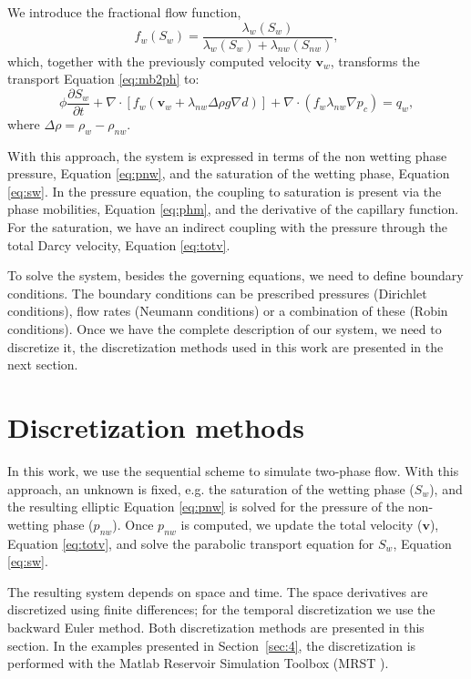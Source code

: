 \documentclass[times,final]{elsarticle}
\begin{document}
We introduce the fractional flow function, 
\begin{equation}\label{eq:fff}
f_{w}(S_w)=\frac{\lambda_{w}(S_w)}{\lambda_{w}(S_w)+\lambda_{nw}(S_{nw})},
\end{equation}
which, together with the previously computed velocity $\mathbf{v}_w$, transforms the transport Equation \eqref{eq:mb2ph} to:
\begin{equation}\label{eq:sw}
 \phi\frac{\partial {S}_{w}}{\partial t}+\nabla \cdot [f_w( \mathbf{v}_w+\lambda_{nw}\Delta  \rho g\nabla d)]+\nabla \cdot(f_w\lambda_{nw}\nabla p_c)= q_w,
\end{equation}
where $\Delta \rho= \rho_w-\rho_{nw}.$ \par
With this approach, the system is expressed in terms of the non wetting phase pressure, Equation \eqref{eq:pnw}, and the saturation of the wetting phase, Equation \eqref{eq:sw}.
In the pressure equation,
the coupling to saturation is present via the phase mobilities, Equation \eqref{eq:phm}, and the derivative of the capillary function. For the saturation, we have an indirect
coupling with the pressure through the total Darcy velocity, Equation \eqref{eq:totv}. \par To solve the system, besides the governing equations, we need to define boundary conditions. The boundary conditions can be prescribed pressures 
(Dirichlet conditions), flow rates (Neumann conditions) or a combination of these (Robin conditions).  Once we have the complete description of our system, we need to discretize it, the discretization methods used in this work are presented in the next section. 



\section{Discretization methods}\label{sec:2}
\hspace{0.5cm} In this work, we use the sequential scheme to simulate two-phase flow.
With this approach, an unknown is fixed, e.g. the saturation of the wetting phase ($S_w$), and the resulting elliptic Equation \eqref{eq:pnw} is solved for the pressure of the non-wetting phase ($p_{nw}$). 
Once $p_{nw}$ is computed, we update the total velocity ($\mathbf{v}$), Equation \eqref{eq:totv}, and solve the parabolic transport equation for $S_w$, Equation \eqref{eq:sw}. \par
 The resulting system depends on space and time. The space derivatives are discretized using finite differences; for the temporal discretization we use the backward Euler method. Both discretization methods are presented in this section. 
 In the examples presented in Section~\ref{sec:4}, the discretization is performed with the Matlab Reservoir Simulation Toolbox (MRST \cite{Lie13}).
\end{document}
